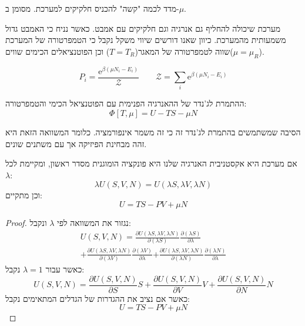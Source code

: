 \documentclass{tstextbook}
\begin{document}
\begin{reminder}
מדד לכמה "קשה" להכניס חלקיקים למערכת. מסומן ב-\(\mu\).

\end{reminder}
\begin{definition}
מערכת שיכולה להחליף גם אנרגיה וגם חלקיקים עם אמבט. כאשר נניח כי האמבט גדול משמעותית מהמערכת. כיוון שאנו דורשים שיווי משקל נקבל כי הטמפרטורה של המערכת שווה לטמפרטורה של המאגר(\(T=T_{R}\)) וכן הפוטנציאלים הכימים שווים(\(\mu=\mu_{R}\)).

\end{definition}
\begin{proposition}
$$P_{i}=\frac{\mathrm{e}^{\beta\left(\mu N_{i}-E_{i}\right)}}{\mathcal{Z}}\qquad {\mathcal Z}=\sum_{i}\mathrm{e}^{\beta\left( \mu N_{i}-E_{i} \right)}$$

\end{proposition}
\begin{definition}
ההתמרת לג'נדר של ההאנרגיה הפנימית עם הפוטנציאל הכימי והטמפרטורה:
$$\Phi[T,\mu]=U-T S-\mu N$$

\end{definition}
\begin{remark}
הסיבה שמשתמשים בהתמרת לג'נדר זה כי זה משמר אינפורמציה. כלומר המשוואה הזאת היא זהה מבחינת הפיזיקה אך עם משתנים שונים.

\end{remark}
\begin{proposition}
אם מערכת היא אקסטניבית האנרגיה שלנו היא פונקציה הומוגנית מסדר ראשון, ומקיימת לכל \(\lambda\):
$$\lambda U(S,V,N)=U(\lambda S,\lambda V,\lambda N)$$
וכן מתקיים:
$$U=T S-P V+\mu N$$

\end{proposition}
\begin{proof}
נגזור את המשוואה לפי \(\lambda\) ונקבל:
$$\begin{gather}{{U(S,V,N)=\frac{\partial U\left( \lambda S,\lambda V,\lambda N \right)}{\partial\left( \lambda S \right)}\frac{\partial\left( \lambda S \right)}{\partial\lambda}}} \\{{+\frac{\partial U\left( \lambda S,\lambda V,\lambda N \right)}{\partial\left( \lambda V \right)}\frac{\partial\left( \lambda V \right)}{\partial\lambda}}}{{+\frac{\partial U\left( \lambda S,\lambda V,\lambda N \right)}{\partial\left( \lambda N \right)}\frac{\partial\left( \lambda N \right)}{\partial\lambda}}} 
\end{gather}$$
כאשר עבור \(\lambda=1\) נקבל:
$$U(S,V,N)=\frac{\partial U(S,V,N)}{\partial S}S+\frac{\partial U(S,V,N)}{\partial V}V+\frac{\partial U(S,V,N)}{\partial N}N$$
כאשר אם נציב את ההגדרות של הגדלים המתאימים נקבל:
$$U=T S-P V+\mu N$$

\end{proof}
\end{document}
